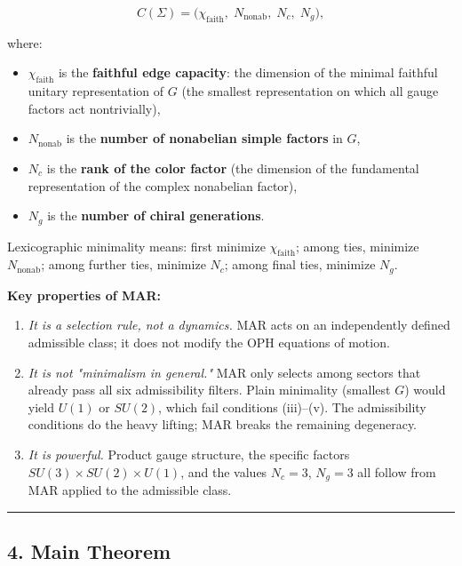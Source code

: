 \[C(\Sigma) = \bigl(\chi_{\mathrm{faith}},\; N_{\mathrm{nonab}},\; N_c,\; N_g\bigr),\]

where:

\begin{itemize}
\tightlist
\item
  \(\chi_{\mathrm{faith}}\) is the \textbf{faithful edge capacity}: the dimension of the minimal faithful unitary representation of \(G\) (the smallest representation on which all gauge factors act nontrivially),
\item
  \(N_{\mathrm{nonab}}\) is the \textbf{number of nonabelian simple factors} in \(G\),
\item
  \(N_c\) is the \textbf{rank of the color factor} (the dimension of the fundamental representation of the complex nonabelian factor),
\item
  \(N_g\) is the \textbf{number of chiral generations}.
\end{itemize}

Lexicographic minimality means: first minimize \(\chi_{\mathrm{faith}}\); among ties, minimize \(N_{\mathrm{nonab}}\); among further ties, minimize \(N_c\); among final ties, minimize \(N_g\).

\textbf{Key properties of MAR:}

\begin{enumerate}
\def\labelenumi{\arabic{enumi}.}
\item
  \emph{It is a selection rule, not a dynamics.} MAR acts on an independently defined admissible class; it does not modify the OPH equations of motion.
\item
  \emph{It is not "minimalism in general."} MAR only selects among sectors that already pass all six admissibility filters. Plain minimality (smallest \(G\)) would yield \(U(1)\) or \(SU(2)\), which fail conditions (iii)--(v). The admissibility conditions do the heavy lifting; MAR breaks the remaining degeneracy.
\item
  \emph{It is powerful.} Product gauge structure, the specific factors \(SU(3) \times SU(2) \times U(1)\), and the values \(N_c = 3\), \(N_g = 3\) all follow from MAR applied to the admissible class.
\end{enumerate}

\begin{center}\rule{0.5\linewidth}{0.5pt}\end{center}

\subsection{4. Main Theorem}\label{4-main-theorem}

